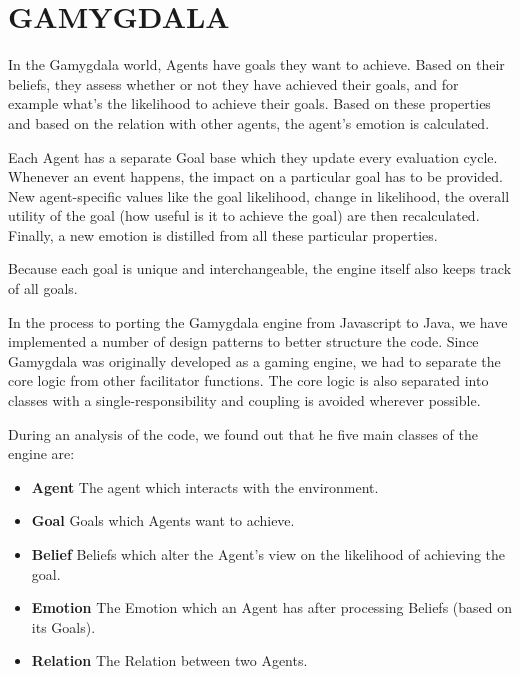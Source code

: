 \section{GAMYGDALA}
In the Gamygdala world, Agents have goals they want to achieve. Based on their beliefs, they assess whether or not they have achieved their goals, and for example what's the likelihood to achieve their goals. Based on these properties and based on the relation with other agents, the agent's emotion is calculated. \\ \par

Each Agent has a separate Goal base which they update every evaluation cycle. Whenever an event happens, the impact on a particular goal has to be provided. New agent-specific values like the goal likelihood, change in likelihood, the overall utility of the goal (how useful is it to achieve the goal) are then recalculated. Finally, a new emotion is distilled from all these particular properties. \\ \par

Because each goal is unique and interchangeable, the engine itself also keeps track of all goals. \\ \par

In the process to porting the Gamygdala engine from Javascript to Java, we have implemented a number of design patterns to better structure the code. Since Gamygdala was originally developed as a gaming engine, we had to separate the core logic from other facilitator functions. The core logic is also separated into classes with a single-responsibility and coupling is avoided wherever possible. \\ \par

During an analysis of the code, we found out that he five main classes of the engine are:
\begin{itemize}
	\item \textbf{Agent} The agent which interacts with the environment.
	\item \textbf{Goal} Goals which Agents want to achieve.
	\item \textbf{Belief} Beliefs which alter the Agent's view on the likelihood of achieving the goal.
	\item \textbf{Emotion} The Emotion which an Agent has after processing Beliefs (based on its Goals).
	\item \textbf{Relation} The Relation between two Agents.
\end{itemize}

